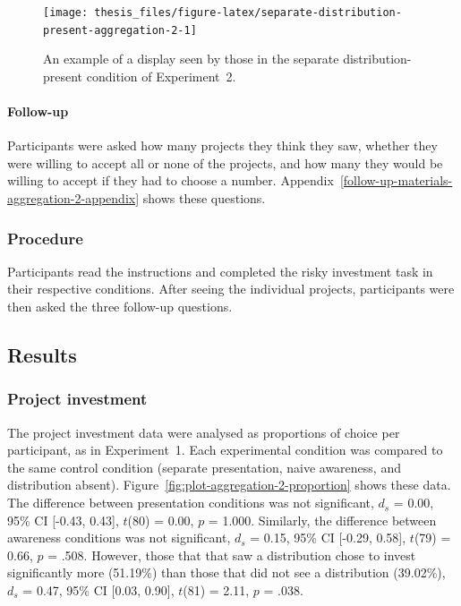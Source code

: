 \documentclass[a4paper, nobind, dvipsnames]{templates/ociamthesis}
\theoremstyle{definition}
\theoremstyle{definition}
\theoremstyle{definition}
\theoremstyle{definition}
\theoremstyle{remark}
\begin{document}
\begin{figure}
\texttt{[image: thesis\_files/figure-latex/separate-distribution-present-aggregation-2-1]} \caption{An example of a display seen by those in the separate distribution-present condition of Experiment~2.}\label{fig:separate-distribution-present-aggregation-2}
\end{figure}

\hypertarget{follow-up-aggregation-2}{%
\paragraph{Follow-up}\label{follow-up-aggregation-2}}

Participants were asked how many projects they think they saw, whether they were
willing to accept all or none of the projects, and how many they would be
willing to accept if they had to choose a number.
Appendix~\ref{follow-up-materials-aggregation-2-appendix} shows these
questions.

\subsubsection{Procedure}

Participants read the instructions and completed the risky investment task in
their respective conditions. After seeing the individual projects, participants
were then asked the three follow-up questions.

\hypertarget{results-aggregation-2}{%
\subsection{Results}\label{results-aggregation-2}}

\subsubsection{Project investment}

The project investment data were analysed as proportions of choice per
participant, as in Experiment~1. Each experimental condition was compared to the
same control condition (separate presentation, naive awareness, and distribution
absent). Figure~\ref{fig:plot-aggregation-2-proportion} shows these data. The
difference between presentation conditions was not significant,
\(d_s\) = 0.00, 95\% CI {[}-0.43, 0.43{]}, \(t\)(80) = 0.00, \(p\) = 1.000. Similarly, the
difference between awareness conditions was not significant,
\(d_s\) = 0.15, 95\% CI {[}-0.29, 0.58{]}, \(t\)(79) = 0.66, \(p\) = .508. However, those that that saw a
distribution chose to invest significantly more
(51.19\%) than those that did
not see a distribution
(39.02\%),
\(d_s\) = 0.47, 95\% CI {[}0.03, 0.90{]}, \(t\)(81) = 2.11, \(p\) = .038.
\end{document}
